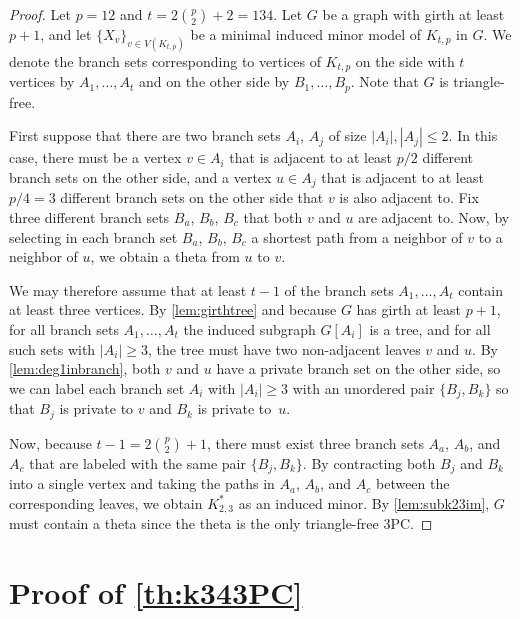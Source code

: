 \documentclass[11pt]{article}
\theoremstyle{definition}
\theoremstyle{definition}
\begin{document}
\begin{proof}
  Let $p = 12$ and $t = 2 \binom{p}{2}+2 = 134$.  Let $G$ be a graph
  with girth at least $p+1$, and let $\{X_v\}_{v \in V(K_{t,p})}$ be a
  minimal induced minor model of $K_{t,p}$ in $G$.  We denote the
  branch sets corresponding to vertices of $K_{t,p}$ on the side with
  $t$ vertices by $A_1, \ldots, A_t$ and on the other side by
  $B_1, \ldots, B_p$.  Note that $G$ is triangle-free. 


  First suppose that there are two branch sets $A_i$, $A_j$ of size
  $|A_i|, |A_j| \le 2$.  In this case, there must be a vertex
  $v \in A_i$ that is adjacent to at least $p/2$ different branch sets
  on the other side, and a vertex $u \in A_j$ that is adjacent to at
  least $p/4 = 3$ different branch sets on the other side that $v$ is
  also adjacent to.  Fix three different branch sets $B_a$, $B_b$,
  $B_c$ that both $v$ and $u$ are adjacent to.  Now, by selecting in
  each branch set $B_a$, $B_b$, $B_c$ a shortest path from a neighbor
  of $v$ to a neighbor of $u$, we obtain a theta from $u$ to $v$.


  We may therefore assume that at least $t-1$ of the branch sets
  $A_1, \ldots, A_t$ contain at least three vertices.
  By \cref{lem:girthtree} and because $G$ has girth at least $p+1$, for all branch sets $A_1, \ldots, A_t$ the
  induced subgraph $G[A_i]$ is a tree, and for all such sets with
  $|A_i| \ge 3$, the tree must have two non-adjacent leaves $v$ and
  $u$.  By \cref{lem:deg1inbranch}, both $v$ and $u$ have a private
  branch set on the other side, so we can label each branch set
  $A_i$ with $|A_i| \ge 3$ with an unordered pair $\{B_j, B_k\}$ so that $B_j$ is private
  to $v$ and $B_k$ is private to~$u$. 
  
  Now, because
  $t-1 = 2 \binom{p}{2}+1$, there must exist three branch sets $A_a$,
  $A_b$, and $A_c$ that are labeled with the same pair $\{B_j, B_k\}$.
  By contracting both $B_j$ and $B_k$ into a single vertex and taking
  the paths in $A_a$, $A_b$, and $A_c$ between the corresponding
  leaves, we obtain $K^{*}_{2,3}$ as an induced minor.  By
  \cref{lem:subk23im}, $G$ must contain a theta since the theta is the
  only triangle-free 3PC.
\end{proof}



\section{Proof of \cref{th:k343PC}}
\label{sec:33}
\end{document}
